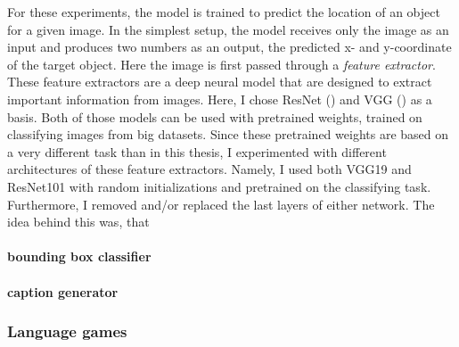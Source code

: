 For these experiments, the model is trained to predict the location of an object for a given image.
In the simplest setup, the model receives only the image as an input and produces two numbers as an output, the predicted x- and y-coordinate of the target object.
Here the image is first passed through a \emph{feature extractor}.
These feature extractors are a deep neural model that are designed to extract important information from images.
Here, I chose ResNet (\cite{He2016}) and VGG (\cite{Simonyan2015}) as a basis.
Both of those models can be used with pretrained weights, trained on classifying images from big datasets.
Since these pretrained weights are based on a very different task than in this thesis, I experimented with different architectures of these feature extractors.
Namely, I used both VGG19 and ResNet101 with random initializations and pretrained on the classifying task.
Furthermore, I removed and/or replaced the last layers of either network.
The idea behind this was, that 

\paragraph{bounding box classifier}

\paragraph{caption generator}

\subsubsection{Language games}